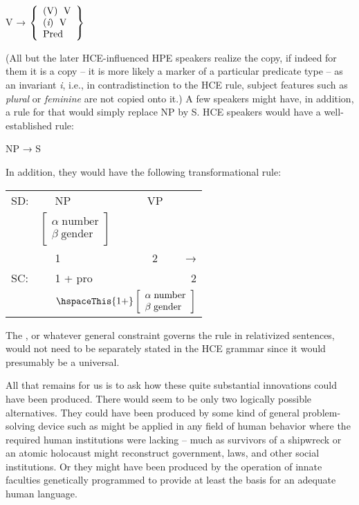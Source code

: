\ea\label{ex:109}
 V → $\left\{\begin{array}{l}\text{(V)\; V}\\\text{({\it i})\; V}\\\text{Pred}\end{array}\right\}$
\z

\noindent (All but the later HCE-influenced HPE speakers realize the copy, if indeed for them it is a copy -- it is more likely a marker of a particular predicate type -- as an invariant \textit{i}, i.e., in contradistinction to the HCE rule, subject features such as \textit{plural} or \textit{feminine} are not copied onto it.) A few speakers might have, in addition, a rule for  that would simply replace NP by S. HCE speakers would have a well-established rule:

\ea\label{ex:110}
 NP → S
\z

\noindent In addition, they would have the following transformational rule:



\ea\label{ex:111}
\begin{tabular}{lllcr}
	SD: & & NP & VP\\
	    & \multicolumn{2}{l}{$\left[\begin{array}{l}\alpha\; \text{number}\\\beta\; \text{gender}\end{array}\right]$} & & \\
	    & & {$\alpha$}1 & 2 & →\\
	SC: & &{$\alpha$}1 + pro & & 2\\
	    & &\multicolumn{3}{l}{$\hspaceThis{1 +}\left[\begin{array}{l}\alpha\; \text{number}\\\beta\; \text{gender}\end{array}\right]$}\\
\end{tabular}
\z

\noindent The , or whatever general constraint governs the  rule in relativized sentences, would not need to be separately stated in the HCE grammar since it would presumably be a universal.

All that remains for us is to ask how these quite substantial innovations could have been produced. There would seem to be only two logically possible alternatives. They could have been produced by some kind of general problem-solving device such as might be applied in any field of human behavior where the required human institutions were lacking -- much as survivors of a shipwreck or an atomic holocaust might reconstruct government, laws, and other social institutions. Or they might have been produced by the operation of innate faculties genetically programmed to provide at least the basis for an adequate human language.

